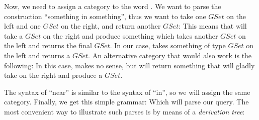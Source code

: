 \documentclass[main.tex]{subfiles}
\begin{document}
Now, we need to assign a category to the word . We want to parse
the construction ``something in something'', thus we want to take one $GSet$
on the left and one $GSet$ on the right, and return another $GSet$:
This means that  will take a $GSet$ on the right and produce something
which takes another $GSet$ on the left and returns the final $GSet$.
In our case,  takes something of type $GSet$ on the left and
returns a $GSet$.
An alternative category that would also work is the following:
In this case,  makes no sense, but 
will return something that will gladly take  on the right and
produce a $GSet$.

The syntax of ``near'' is similar to the syntax of ``in'', so we will assign
the same category. Finally, we get this simple grammar:
Which will parse our query. The most convenient way to illustrate such parses
is by means of a \emph{derivation tree}:

\end{document}
